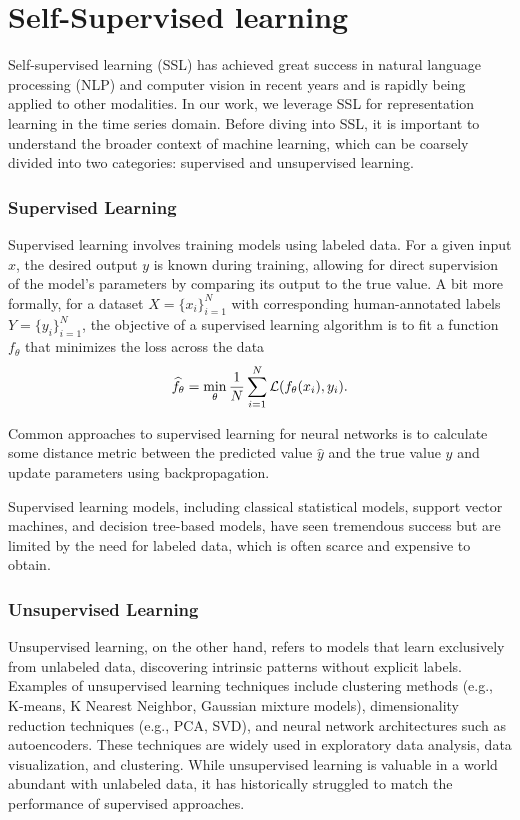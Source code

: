 \documentclass[../../thesis.tex]{subfiles}
\begin{document}
\section{Self-Supervised learning}

Self-supervised learning (SSL) has achieved great success in natural language processing (NLP) and computer vision in recent years and is rapidly being applied to other modalities. In our work, we leverage SSL for representation learning in the time series domain. Before diving into SSL, it is important to understand the broader context of machine learning, which can be coarsely divided into two categories: supervised and unsupervised learning.

\subsubsection*{Supervised Learning}

Supervised learning involves training models using labeled data. For a given input $x$, the desired output $y$ is known during training, allowing for direct supervision of the model's parameters by comparing its output to the true value. A bit more formally, for a dataset $X = \{x_i\}_{i=1}^N$ with corresponding human-annotated labels $Y = \{y_i\}_{i=1}^N$, the objective of a supervised learning algorithm is to fit a function $f_\theta$ that minimizes the loss across the data
\begin{equation}
    \widehat{f}_\theta = \min_\theta \frac{1}{N} \sum_{i=1}^N \mathcal{L}(f_\theta(x_i),y_i).
\end{equation}

Common approaches to supervised learning for neural networks is to calculate some distance metric between the predicted value $\widehat{y}$ and the true value $y$ and update parameters using backpropagation.\newline

Supervised learning models, including classical statistical models, support vector machines, and decision tree-based models, have seen tremendous success but are limited by the need for labeled data, which is often scarce and expensive to obtain.

\subsubsection*{Unsupervised Learning}

Unsupervised learning, on the other hand, refers to models that learn exclusively from unlabeled data, discovering intrinsic patterns without explicit labels. Examples of unsupervised learning techniques include clustering methods (e.g., K-means, K Nearest Neighbor, Gaussian mixture models), dimensionality reduction techniques (e.g., PCA, SVD), and neural network architectures such as autoencoders. These techniques are widely used in exploratory data analysis, data visualization, and clustering. While unsupervised learning is valuable in a world abundant with unlabeled data, it has historically struggled to match the performance of supervised approaches.
\end{document}
